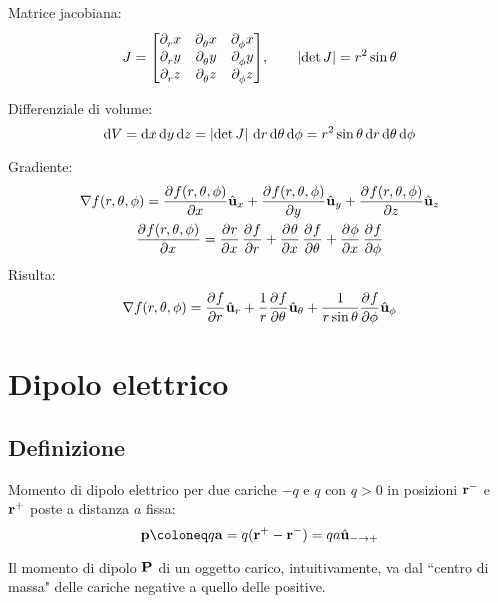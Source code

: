 Matrice jacobiana:
\begin{equation}
    J = \begin{bmatrix}
        \parder[x]{r} & \parder[x]{\theta} & \parder[x]{\phi} \\
        \parder[y]{r} & \parder[y]{\theta} & \parder[y]{\phi} \\
        \parder[z]{r} & \parder[z]{\theta} & \parder[z]{\phi}
    \end{bmatrix}\!, \qquad
    \abs{\det J} = r^2 \sin \theta
\end{equation}

Differenziale di volume:
\begin{equation}
    \mathrm{d} V = \mathrm{d} x \, \mathrm{d} y \, \mathrm{d} z
    = \left\lvert \det J \right\rvert \, \mathrm{d} r \, \mathrm{d} \theta \, \mathrm{d} \phi
    = r^2 \sin \theta \, \mathrm{d} r \, \mathrm{d} \theta \, \mathrm{d} \phi
\end{equation}

Gradiente:
\begin{gather}
    \grad f(r, \theta, \phi) = \parder[f(r, \theta, \phi)]{x} \ux + \parder[f(r, \theta, \phi)]{y} \uy + \parder[f(r, \theta, \phi)]{z} \uz \\
    \parder[f(r, \theta, \phi)]{x} =
    \parder[r]{x} \, \parder[f]{r} +
    \parder[\theta]{x} \, \parder[f]{\theta} +
    \parder[\phi]{x} \, \parder[f]{\phi}
\end{gather}
Risulta:
\begin{equation}
    \grad f(r, \theta, \phi) = \parder[f]{r} \ver{r} + \frac{1}{r}\parder[f]{\theta} \ver{\theta} + \frac{1}{r \sin \theta} \parder[f]{\phi} \ver{\phi}
\end{equation}




\section{Dipolo elettrico}

\subsection{Definizione}

Momento di dipolo elettrico per due cariche $-q$ e $q$ con $q > 0$ in posizioni $\mathbf{r}^-$ e $\mathbf{r}^+$ poste a distanza $a$ fissa:
\begin{equation}
    \vt{p} \coloneq q \vt{a} = q (\p^+ - \p^-) = q a \ver{- \to +}
\end{equation}

Il momento di dipolo $\mathbf{P}$ di un oggetto carico, intuitivamente, va dal ``centro di massa" delle cariche negative a quello delle positive.

